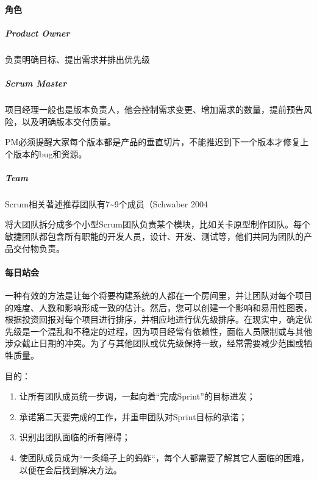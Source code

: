 \documentclass[letterpaper,11pt,english]{sphinxmanual}
\begin{document}
\paragraph{角色}
\label{\detokenize{chapter_project/Scrum:id8}}

\subparagraph{Product Owner}
\label{\detokenize{chapter_project/Scrum:product-owner}}
负责明确目标、提出需求并排出优先级


\subparagraph{Scrum Master}
\label{\detokenize{chapter_project/Scrum:scrum-master}}
项目经理一般也是版本负责人，他会控制需求变更、增加需求的数量，提前预告风险，以及明确版本交付质量。

PM必须提醒大家每个版本都是产品的垂直切片，不能推迟到下一个版本才修复上个版本的bug和资源。


\subparagraph{Team}
\label{\detokenize{chapter_project/Scrum:team}}
Scrum相关著述推荐团队有7\textasciitilde{}9个成员（Schwaber 2004

将大团队拆分成多个小型Scrum团队负责某个模块，比如关卡原型制作团队。每个敏捷团队都包含所有职能的开发人员，设计、开发、测试等，他们共同为团队的产品交付物负责。


\paragraph{每日站会}
\label{\detokenize{chapter_project/Scrum:id9}}
一种有效的方法是让每个将要构建系统的人都在一个房间里，并让团队对每个项目的难度、人数和影响形成一致的估计。然后，您可以创建一个影响和易用性图表，根据投资回报对每个项目进行排序，并相应地进行优先级排序。在现实中，确定优先级是一个混乱和不稳定的过程，因为项目经常有依赖性，面临人员限制或与其他涉众截止日期的冲突。为了与其他团队或优先级保持一致，经常需要减少范围或牺牲质量。

目的：
\begin{enumerate}
%
\item {} 
让所有团队成员统一步调，一起向着“完成Sprint”的目标进发；

\item {} 
承诺第二天要完成的工作，并重申团队对Sprint目标的承诺；

\item {} 
识别出团队面临的所有障碍；

\item {} 
使团队成员成为“一条绳子上的蚂蚱“，每个人都需要了解其它人面临的困难，以便在会后找到解决方法。

\end{enumerate}
\end{document}
